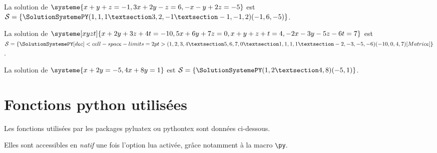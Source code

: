 \documentclass[a4paper,11pt]{article}
\begin{document}
\begin{PresentationCode}{}
La solution de $\systeme{x+y+z=-1,3x+2y-z=6,-x-y+2z=-5}$ est $\mathcal{S}=%
\left\lbrace \SolutionSystemePY(1,1,1 § 3,2,-1 § -1,-1,2)(-1,6,-5) \right\rbrace$.
\end{PresentationCode}

\begin{PresentationCode}{}
La solution de $\systeme[xyzt]{x+2y+3z+4t=-10,5x+6y+7z=0,x+y+z+t=4,-2x-3y-5z-6t=7}$
est $\mathcal{S}=%
\left\lbrace
	\SolutionSystemePY%
		[dec]<cell-space-limits=2pt>%
		(1,2,3,4 § 5,6,7,0 § 1,1,1,1 § -2,-3,-5,-6)(-10,0,4,7)%
		[Matrice]
\right\rbrace$.
\end{PresentationCode}

\begin{PresentationCode}{}
La solution de $\systeme{x+2y=-5,4x+8y=1}$ est $\mathcal{S}=%
\left\lbrace \SolutionSystemePY(1,2 § 4,8)(-5,1) \right\rbrace$.
\end{PresentationCode}

\pagebreak

\part{Fonctions python utilisées}

\begin{cautionblock}
Les fonctions utilisées par les packages \textsf{pyluatex} ou \textsf{pythontex} sont données ci-dessous.

Elles sont accessibles en \textit{natif} une fois l'option \textsf{lua} activée, grâce notamment à la macro \texttt{\textbackslash py}.
\end{cautionblock}
\end{document}
